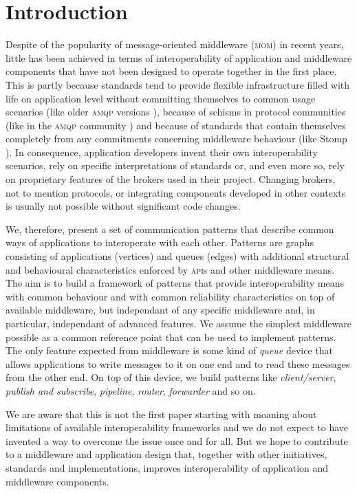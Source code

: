 \documentclass[a4paper]{scrartcl}
\newcommand{\acronym}[1]{\textsc{#1}}
\newcommand{\term}[1]{\emph{#1}}
\newcommand{\ignore}[1]{}
\begin{document}
\section{Introduction}
\ignore{
The main motivation for the work described here
is helping losers lose less.}

Despite of the popularity of 
message-oriented middleware (\acronym{mom}) in recent years,
little has been achieved in terms of
interoperability of application
and middleware components that have not been
designed to operate together in the first place.
This is partly because standards tend to provide
flexible infrastructure filled with life
on application level 
without committing themselves to common usage scenarios
(like older \acronym{amqp} versions \cite{amqp09}),
because of schisms in protocol communities 
(like in the \acronym{amqp} community \cite{amqp09, amqp10})
and because of standards that contain themselves completely
from any commitments concerning middleware behaviour 
(like Stomp \cite{stomp12}).
In consequence,
application developers invent their own interoperability scenarios,
rely on specific interpretations of standards
or, and even more so, rely on proprietary features
of the brokers used in their project.
Changing brokers, not to mention protocols,
or integrating components developed in other contexts
is usually not possible without significant code changes.

We, therefore, present a set of communication patterns 
that describe common ways of applications to interoperate with each other.
Patterns are graphs consisting of applications (vertices)  
and queues (edges) with additional structural and behavioural
characteristics enforced by \acronym{api}s and other middleware means.
The aim is to build a framework of patterns
that provide interoperability means with 
common behaviour and with common reliability characteristics
on top of available middleware, but independant of 
any specific middleware and, in particular,
independant of advanced features.
We assume the simplest middleware possible
as a common reference point that can be used to implement patterns.
The only feature expected from middleware 
is some kind of \term{queue} device
that allows applications to write messages to it on one end
and to read these messages from the other end.
On top of this device, we build patterns like
\term{client/server}, \term{publish and subscribe},
\term{pipeline}, \term{router}, \term{forwarder}
and so on.

We are aware that this is not the first paper
starting with moaning about limitations of available
interoperability frameworks and we do not expect
to have invented a way to overcome the issue
once and for all.
But we hope to contribute to a middleware
and application design that, together with other
initiatives, standards and implementations,
improves interoperability of 
application and middleware components.
\end{document}
